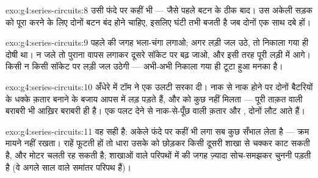 \begin{solution}{exo:g4:series-circuits:8}
उसी फंदे पर कहीं भी --- जैसे पहले बटन के ठीक बाद।  उस
अकेली सड़क को पूरा करने के लिए दोनों बटन बंद होने चाहिए, इसलिए घंटी
तभी बजती है जब दोनों एक साथ दबे हों।
\end{solution}

\begin{solution}{exo:g4:series-circuits:9}
पहले  की जगह भला-चंगा  लगाओ; अगर लड़ी जल उठे, तो निकाला गया
 ही दोषी था। न जले तो पुराना  वापस लगाकर दूसरे सॉकेट पर बढ़
जाओ, और इसी तरह पूरी लड़ी में आगे। किसी न किसी सॉकेट पर लड़ी जल उठेगी
--- अभी-अभी निकाला गया  ही टूटा हुआ मनका है।
\end{solution}

\begin{solution}{exo:g4:series-circuits:10}
अँधेरे में टॉम ने एक  उलटी सरका दी। नाक से नाक होने पर दोनों
बैटरियों के धक्के क़तार बनाने के बजाय आपस में लड़ पड़ते हैं, और 
को कुछ नहीं मिलता --- पूरी ताक़त वाली बराबरी भी आख़िर बराबरी ही है।
एक  पलट देने से नाक-से-पूँछ वाली क़तार और , दोनों लौट आते
हैं।
\end{solution}

\begin{solution}{exo:g4:series-circuits:11}
वह सही है: अकेले फंदे पर कहीं भी लगा  सब कुछ सँभाल लेता है ---
क्रम मायने नहीं रखता। राहें फूटती हों तो धारा उसके  को छोड़कर
किसी दूसरी शाखा से चक्कर काट सकती है, और मोटर चलती रह सकती है; शाखाओं
वाले परिपथों में  की जगह ज़्यादा सोच-समझकर चुननी पड़ती है (वे
अगले साल वाले समांतर परिपथ हैं)।
\end{solution}
